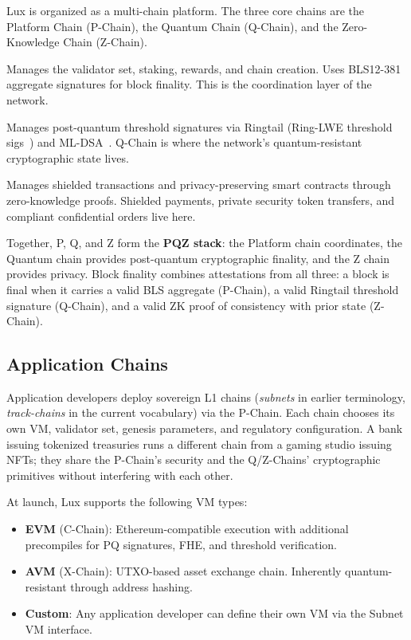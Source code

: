 \documentclass[11pt,a4paper]{article}
\begin{document}
Lux is organized as a multi-chain platform. The three core chains are
the Platform Chain (P-Chain), the Quantum Chain (Q-Chain), and the
Zero-Knowledge Chain (Z-Chain).

\begin{description}[nosep,leftmargin=0pt]
  \item[P-Chain (Platform)] Manages the validator set, staking,
        rewards, and chain creation. Uses BLS12-381 aggregate
        signatures for block finality. This is the coordination layer
        of the network.
  \item[Q-Chain (Quantum)] Manages post-quantum threshold signatures
        via Ringtail (Ring-LWE threshold sigs~\cite{ringtail}) and
        ML-DSA~\cite{mldsa}. Q-Chain is where the network's
        quantum-resistant cryptographic state lives.
  \item[Z-Chain (Zero-Knowledge)] Manages shielded transactions and
        privacy-preserving smart contracts through zero-knowledge
        proofs. Shielded payments, private security token transfers,
        and compliant confidential orders live here.
\end{description}

Together, P, Q, and Z form the \textbf{PQZ stack}: the Platform chain
coordinates, the Quantum chain provides post-quantum cryptographic
finality, and the Z chain provides privacy. Block finality combines
attestations from all three: a block is final when it carries a
valid BLS aggregate (P-Chain), a valid Ringtail threshold signature
(Q-Chain), and a valid ZK proof of consistency with prior state
(Z-Chain).

\subsection{Application Chains}

Application developers deploy sovereign L1 chains (\emph{subnets} in
earlier terminology, \emph{track-chains} in the current vocabulary)
via the P-Chain. Each chain chooses its own VM, validator set,
genesis parameters, and regulatory configuration. A bank issuing
tokenized treasuries runs a different chain from a gaming studio
issuing NFTs; they share the P-Chain's security and the Q/Z-Chains'
cryptographic primitives without interfering with each other.

At launch, Lux supports the following VM types:

\begin{itemize}[nosep]
  \item \textbf{EVM} (C-Chain): Ethereum-compatible execution with
        additional precompiles for PQ signatures, FHE, and threshold
        verification.
  \item \textbf{AVM} (X-Chain): UTXO-based asset exchange chain.
        Inherently quantum-resistant through address hashing.
  \item \textbf{Custom}: Any application developer can define their
        own VM via the Subnet VM interface.
\end{itemize}
\end{document}
